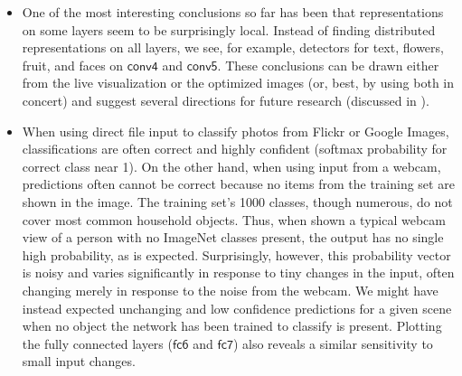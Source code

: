 \documentclass{article}
\newcommand{\layer}[1]{\ensuremath{\mathsf{#1}\xspace}}
\begin{document}

\begin{itemize}


\item One of the most interesting conclusions so far has been that representations on some layers seem to be surprisingly local. Instead of finding distributed representations on all layers, we see, for example, detectors for text, flowers, fruit, and faces on \layer{conv4} and \layer{conv5}. These conclusions can be drawn either from the live visualization or the optimized images (or, best, by using both in concert) and suggest several directions for future research (discussed in ).

\item When using direct file input to classify photos from Flickr or Google Images, classifications are often correct and highly confident (softmax probability for correct class near 1). On the other hand, when using input from a webcam, predictions often cannot be correct because no items from the training set are shown in the image. The training set's 1000 classes, though numerous, do not cover most common household objects. Thus, when shown a typical webcam view of a person with no ImageNet classes present, the output has no single high probability, as is expected. Surprisingly, however, this probability vector is noisy and varies significantly in response to tiny changes in the input, often changing merely in response to the noise from the webcam. We might have instead expected unchanging and low confidence predictions for a given scene when no object the network has been trained to classify is present. Plotting the fully connected layers (\layer{fc6} and \layer{fc7}) also reveals a similar sensitivity to small input changes. 


\end{itemize}
\end{document}
